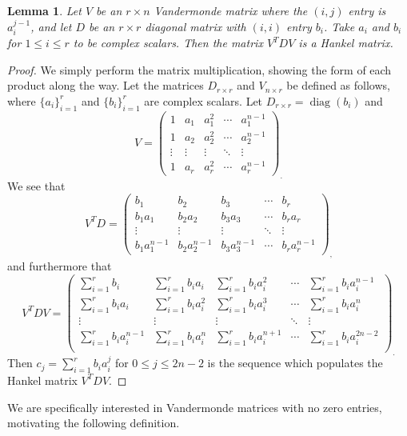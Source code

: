 \documentclass[12pt,reqno]{article}
\newtheorem{lemma}{Lemma}
\DeclareMathOperator{\diag}{diag}
\begin{document}
\begin{lemma}\label{Lem:VandeComp}
Let $V$ be an $r\times n$ Vandermonde matrix where the $(i,j)$ entry is $a_i^{j-1}$, and let $D$ be an $r\times r$ diagonal matrix with $(i,i)$ entry $b_i$. Take $a_i$ and $b_i$ for $1\leq i\leq r$ to be complex scalars. Then the matrix $V^TDV$ is a Hankel matrix. 
\end{lemma}
\begin{proof}
We simply perform the matrix multiplication, showing the form of each product along the way. Let the matrices $D_{r\times r}$ and $V_{n\times r}$ be defined as follows, where $\{a_i\}_{i=1}^r$ and $\{b_i\}_{i=1}^r$ are complex scalars. Let $D_{r\times r} = \diag(b_i)$ and 
$$
V = \begin{pmatrix}
1 & a_1 & a_1^2 & \cdots & a_1^{n-1} \\
1 & a_2 & a_2^2 & \cdots & a_2^{n-1} \\
\vdots & \vdots & \vdots & \ddots & \vdots \\
1 & a_{r} & a_{r}^2 & \cdots  & a_r^{n-1}
\end{pmatrix}_.
$$
We see that  
$$
V^TD = \begin{pmatrix}
b_1 & b_2 & b_3 & \cdots & b_r \\
b_1 a_1 & b_2 a_2 & b_3 a_3 & \cdots & b_r a_r \\
\vdots & \vdots & \vdots & \ddots & \vdots \\
b_1 a_1^{n-1} & b_2 a_2^{n-1} & b_3 a_3^{n-1} & \cdots  & b_r a_r^{n-1}
\end{pmatrix}_,
$$
and furthermore that 
$$
V^TDV = \begin{pmatrix}
\sum_{i=1}^r b_i & \sum_{i=1}^r b_i a_i & \sum_{i=1}^r b_i a_i^2 & \cdots & \sum_{i=1}^r b_i a_i^{n-1} \\
\sum_{i=1}^r b_i a_i & \sum_{i=1}^r b_i a_i^2 & \sum_{i=1}^r b_i a_i^3 & \cdots & \sum_{i=1}^r b_i a_i^{n} \\
\vdots & \vdots & \vdots & \ddots & \vdots \\
\sum_{i=1}^r b_i a_i^{n-1} & \sum_{i=1}^r b_i a_i^n & \sum_{i=1}^r b_i a_i^{n+1} & \cdots & \sum_{i=1}^r b_i a_i^{2n-2} \\
\end{pmatrix}_.
$$
Then $c_j = \sum_{i=1}^r b_i a_i^j$ for $0\leq j\leq 2n-2$ is the sequence which populates the Hankel matrix $V^T D V$. 
\end{proof}

We are specifically interested in Vandermonde matrices with no zero entries, motivating the following definition. 
\end{document}
